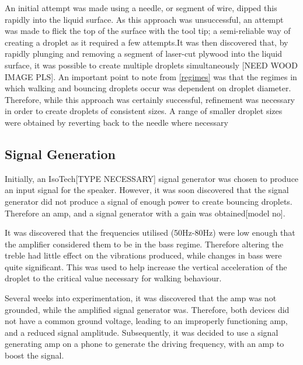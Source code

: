 An initial attempt was made using a needle, or segment of wire,  dipped this rapidly into the liquid surface. As this approach was unsuccessful,  an attempt was made to flick the top of the surface with the tool tip; a semi-reliable way of creating a droplet as it required a few attempts.It was then discovered that, by rapidly plunging and  removing a segment of laser-cut plywood into the liquid surface, it was possible to create multiple droplets simultaneously [NEED WOOD IMAGE PLS]. An important point to note from \ref{regimes} was that the regimes in which walking and bouncing droplets occur was dependent on droplet diameter. Therefore, while this approach was certainly successful, refinement was necessary in order to create droplets of consistent sizes. A range of smaller droplet sizes were obtained by reverting back to the needle where necessary

\subsection{Signal Generation}
Initially, an IsoTech[TYPE NECESSARY] signal generator was chosen to produce an input signal for the speaker. However, it was soon discovered that the signal generator did not produce a signal of enough power to create bouncing droplets. Therefore an amp, and a signal generator with a gain was obtained[model no]. 

It was discovered that  the frequencies utilised (50Hz-80Hz) were low enough that the amplifier considered them to be in the bass regime. Therefore altering the treble had little effect on the vibrations produced, while changes in bass were quite significant. This was used to help increase the vertical acceleration of the droplet to the critical value necessary for walking behaviour. 

Several weeks into experimentation, it was discovered that the amp was not grounded, while the amplified signal generator was. Therefore, both devices did not have a common ground voltage, leading to an improperly functioning amp, and a reduced signal amplitude. Subsequently, it was decided to use a signal generating amp on a phone to generate the driving frequency, with an amp to boost the signal.  

